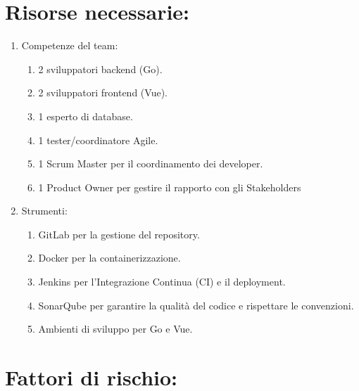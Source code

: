 \documentclass{article}
\begin{document}
\section{Risorse necessarie:}

\begin{enumerate}
    \item Competenze del team:
        \begin{enumerate}
            \item 2 sviluppatori backend (Go).
            \item 2 sviluppatori frontend (Vue).
            \item 1 esperto di database.
            \item 1 tester/coordinatore Agile.
            \item 1 Scrum Master per il coordinamento dei developer.
            \item 1 Product Owner per gestire il rapporto con gli Stakeholders
        \end{enumerate}
    \item Strumenti:
        \begin{enumerate}
            \item GitLab per la gestione del repository.
            \item Docker per la containerizzazione.
            \item Jenkins per l'Integrazione Continua (CI) e il deployment.
            \item SonarQube per garantire la qualità del codice e rispettare le convenzioni.
            \item Ambienti di sviluppo per Go e Vue.
        \end{enumerate}
\end{enumerate}

\section{Fattori di rischio:}
\end{document}
